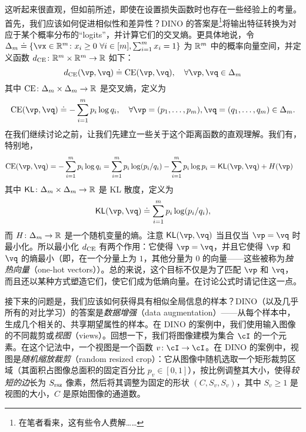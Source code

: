 \documentclass[../../book-main.tex]{subfiles}
\begin{document}
这听起来很直观，但如前所述，即使在设置损失函数时也存在一些经验上的考量。首先，我们应该如何促进相似性和差异性？DINO \citep{caron2021emerging} 的答案是\footnote{在笔者看来，这有些令人费解……}将输出特征转换为对应于某个概率分布的“logits”，并计算它们的交叉熵。更具体地说，令 \(\Delta_{m} \doteq \{\vx \in \R^{m} \colon x_{i} \geq 0\ \forall i \in [m], \sum_{i = 1}^{m}x_{i} = 1\}\) 为 \(\mathbb{R}^{m}\) 中的概率向量空间，并定义函数 \(d_{\operatorname{CE}} \colon \mathbb{R}^{m} \times \mathbb{R}^{m} \to \mathbb{R}\) 如下：
 \begin{equation}\label{eq:cross_entropy_difference}
    d_{\CE}(\vp, \vq) \doteq \CE(\vp, \vq), \quad \forall \vp, \vq \in \Delta_{m}
 \end{equation}
 其中 \(\operatorname{CE} \colon \Delta_{m} \times \Delta_{m} \to \mathbb{R}\) 是交叉熵，定义为
 \begin{equation}\label{eq:expts_def_ce}
    \CE(\vp, \vq) \doteq -\sum_{i = 1}^{m}p_{i}\log q_{i}, \quad \forall \vp = (p_{1}, \dots, p_{m}), \vq = (q_{1}, \dots, q_{m}) \in \Delta_{m}.
 \end{equation}
 在我们继续讨论之前，让我们先建立一些关于这个距离函数的直观理解。我们有，特别地，
 \begin{align}
    \CE(\vp, \vq)
    &= -\sum_{i = 1}^{m}p_{i}\log q_{i} = \sum_{i = 1}^{m}p_{i}\log(p_{i}/q_{i}) - \sum_{i = 1}^{m}p_{i}\log p_{i} = \KL(\vp, \vq) + H(\vp)
 \end{align}
 其中 \(\operatorname{\mathsf{KL}} \colon \Delta_{m} \times \Delta_{m} \to \mathbb{R}\) 是 KL 散度，定义为
 \begin{equation}
    \KL(\vp, \vq) \doteq \sum_{i = 1}^{m}p_{i}\log(p_{i}/q_{i}),
 \end{equation}
 而 \(H \colon \Delta_{m} \to \mathbb{R}\) 是一个随机变量的熵。注意 \(\KL(\vp, \vq)\) 当且仅当 \(\vp = \vq\) 时最小化。所以最小化 \(d_{\operatorname{CE}}\) 有两个作用：它使得 \(\vp = \vq\)，并且它使得 \(\vp\) 和 \(\vq\) 的熵最小（即，在一个分量上为 \(1\)，其他分量为 \(0\) 的向量——这些被称为\textit{独热向量}（one-hot vectors））。总的来说，这个目标不仅是为了匹配 \(\vp\) 和 \(\vq\)，而且还以某种方式塑造它们，使它们成为低熵向量。在讨论公式时请记住这一点。

接下来的问题是，我们应该如何获得具有相似全局信息的样本？DINO（以及几乎所有的对比学习）的答案是\textit{数据增强}（data augmentation）——从每个样本中，生成几个相关的、共享期望属性的样本。在 DINO 的案例中，我们使用输入图像的不同裁剪或\textit{视图}（views）。回想一下，我们将图像建模为集合 \(\cI\) 的一个元素。在这个记法中，一个视图是一个函数 \(v \colon \cI \to \cI\)。在 DINO 的案例中，视图是\textit{随机缩放裁剪}（random resized crop）：它从图像中随机选取一个矩形裁剪区域（其面积占图像总面积的固定百分比 \(p_{v} \in [0, 1]\)），按比例调整其大小，使得\textit{较短的边}长为 \(S_{\mathrm{rsz}}\) 像素，然后将其调整为固定的形状 \((C, S_{v}, S_{v})\)，其中 \(S_{v} \geq 1\) 是视图的大小，\(C\) 是原始图像的通道数。
\end{document}
